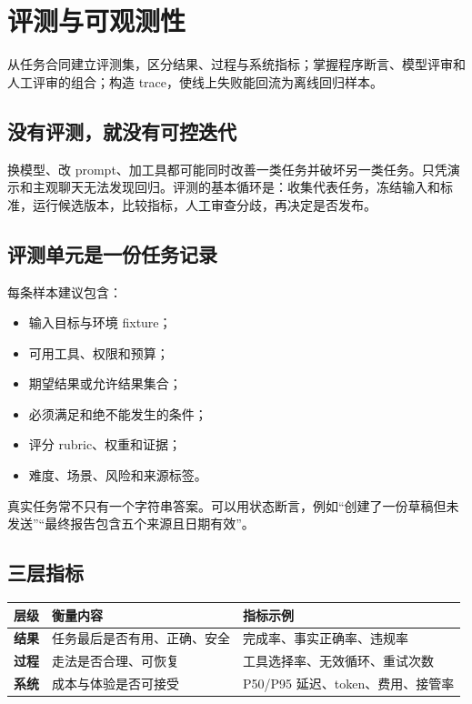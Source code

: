 \chapter{评测与可观测性}
\label{chap:evaluation}

\begin{takeaway}[学习目标]
从任务合同建立评测集，区分结果、过程与系统指标；掌握程序断言、模型评审和人工评审的组合；构造 trace，使线上失败能回流为离线回归样本。
\end{takeaway}

\section{没有评测，就没有可控迭代}

换模型、改 prompt、加工具都可能同时改善一类任务并破坏另一类任务。只凭演示和主观聊天无法发现回归。评测的基本循环是：收集代表任务，冻结输入和标准，运行候选版本，比较指标，人工审查分歧，再决定是否发布。

\section{评测单元是一份任务记录}

每条样本建议包含：

\begin{itemize}
  \item 输入目标与环境 fixture；
  \item 可用工具、权限和预算；
  \item 期望结果或允许结果集合；
  \item 必须满足和绝不能发生的条件；
  \item 评分 rubric、权重和证据；
  \item 难度、场景、风险和来源标签。
\end{itemize}

真实任务常不只有一个字符串答案。可以用状态断言，例如“创建了一份草稿但未发送”“最终报告包含五个来源且日期有效”。

\section{三层指标}

\begin{table}[htbp]
\centering
\begin{tabularx}{\textwidth}{>{\bfseries}p{} X X}
\toprule
层级 & 衡量内容 & 指标示例 \\
\midrule
结果 & 任务最后是否有用、正确、安全 & 完成率、事实正确率、违规率 \\
过程 & 走法是否合理、可恢复 & 工具选择率、无效循环、重试次数 \\
系统 & 成本与体验是否可接受 & P50/P95 延迟、token、费用、接管率 \\
\bottomrule
\end{tabularx}
\end{table}

